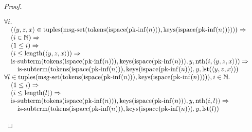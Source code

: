 \documentclass[11pt]{article}
\theoremstyle{plain}
\begin{document}
\begin{proof}
\begin{itemize}[leftmargin=2.8em, itemsep=4pt, parsep=1pt]
\begin{itemize}[leftmargin=2.8em, itemsep=4pt, parsep=1pt]
\begin{equation*}
\begin{array}{@{}l@{}}
\begin{array}{@{}l@{}} \forall i. \\ \quad (\langle y, z, x \rangle \in \operatorname{tuples}(\operatorname{msg\text{-}set}(\operatorname{tokens}(\operatorname{ispace}(\operatorname{pk\text{-}inf}(n))), \operatorname{keys}(\operatorname{ispace}(\operatorname{pk\text{-}inf}(n)))))) \Rightarrow  \\ \quad (i \in \mathbb{N}) \Rightarrow  \\ \quad (1 \leq i) \Rightarrow  \\ \quad (i \leq \operatorname{length}(\langle y, z, x \rangle)) \Rightarrow  \\ \quad \operatorname{is\text{-}subterm}(\operatorname{tokens}(\operatorname{ispace}(\operatorname{pk\text{-}inf}(n))), \operatorname{keys}(\operatorname{ispace}(\operatorname{pk\text{-}inf}(n))), y, \operatorname{nth}(i, \langle y, z, x \rangle)) \Rightarrow  \\ \quad \quad \operatorname{is\text{-}subterm}(\operatorname{tokens}(\operatorname{ispace}(\operatorname{pk\text{-}inf}(n))), \operatorname{keys}(\operatorname{ispace}(\operatorname{pk\text{-}inf}(n))), y, \operatorname{lst}(\langle y, z, x \rangle)) \end{array} \\
\begin{array}{@{}l@{}} \forall l \in \operatorname{tuples}(\operatorname{msg\text{-}set}(\operatorname{tokens}(\operatorname{ispace}(\operatorname{pk\text{-}inf}(n))), \operatorname{keys}(\operatorname{ispace}(\operatorname{pk\text{-}inf}(n))))), i \in \mathbb{N}. \\ \quad (1 \leq i) \Rightarrow  \\ \quad (i \leq \operatorname{length}(l)) \Rightarrow  \\ \quad \operatorname{is\text{-}subterm}(\operatorname{tokens}(\operatorname{ispace}(\operatorname{pk\text{-}inf}(n))), \operatorname{keys}(\operatorname{ispace}(\operatorname{pk\text{-}inf}(n))), y, \operatorname{nth}(i, l)) \Rightarrow  \\ \quad \quad \operatorname{is\text{-}subterm}(\operatorname{tokens}(\operatorname{ispace}(\operatorname{pk\text{-}inf}(n))), \operatorname{keys}(\operatorname{ispace}(\operatorname{pk\text{-}inf}(n))), y, \operatorname{lst}(l)) \end{array} \\

\end{array}
\end{equation*}
\end{itemize}
\end{itemize}
\end{proof}
\end{document}
